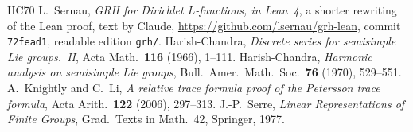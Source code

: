 \documentclass[reqno]{amsart}
\theoremstyle{definition}
\theoremstyle{plain}
\theoremstyle{remark}
\begin{document}
\begin{thebibliography}{HC70}
 L.~Sernau, \emph{GRH for Dirichlet \(L\)-functions, in Lean~4}, a shorter rewriting of the Lean proof, text by Claude, \url{https://github.com/lsernau/grh-lean}, commit \texttt{72fead1}, readable edition \texttt{grh/}.
 Harish-Chandra, \emph{Discrete series for semisimple Lie groups.~II}, Acta Math.\ \textbf{116} (1966), 1--111.
 Harish-Chandra, \emph{Harmonic analysis on semisimple Lie groups}, Bull.\ Amer.\ Math.\ Soc.\ \textbf{76} (1970), 529--551.
 A.~Knightly and C.~Li, \emph{A relative trace formula proof of the Petersson trace formula}, Acta Arith.\ \textbf{122} (2006), 297--313.
 J.-P.~Serre, \emph{Linear Representations of Finite Groups}, Grad.\ Texts in Math.\ 42, Springer, 1977.
\end{thebibliography}
\end{document}
